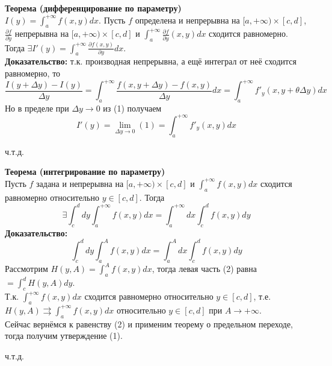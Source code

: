 \documentclass[book, 11pt]{report}
\begin{document}
\par{\textbf{Теорема (дифференцирование по параметру)}\\ 
$\displaystyle I(y)=\int_a^{+\infty}f(x,y)dx$. Пусть $f$ определена и непрерывна на $[a,+\infty)\times[c,d]$, $\displaystyle\frac{\partial f}{\partial y}$ непрерывна на $[a,+\infty)\times[c,d]$ и $\displaystyle\int_a^{+\infty}\frac{\partial f}{\partial y}(x,y)dx$ сходится равномерно. Тогда $\displaystyle\exists I'(y)=\int_a^{+\infty}\frac{\partial f(x,y)}{\partial y}dx$.\\
\textbf{Доказательство: } т.к. производная непрерывна, а ещё интеграл от неё сходится равномерно, то
\begin{equation}
    \frac{I(y+\Delta y)-I(y)}{\Delta y}=\int_a^{+\infty}\frac{f(x,y+\Delta y)-f(x,y)}{\Delta y}dx=\int_a^{+\infty}f'_y(x,y+\theta\Delta y)dx
\end{equation}
Но в пределе при $\Delta y\to0$ из (1) получаем
\begin{equation}
    I'(y)=\lim_{\Delta y\to0}(1)=\int_a^{+\infty}f'_y(x,y)dx
\end{equation}
}
\par{{\raggedleft ч.т.д.\par}}
    \vspace{1.5cm}
    \setcounter{equation}{0}
\par{\textbf{Теорема (интегрирование по параметру)}\\
Пусть $f$ задана и непрерывна на $[a,+\infty)\times[c,d]$ и $\displaystyle\int_a^{+\infty}f(x,y)dx$ сходится равномерно относительно $y\in[c,d]$. Тогда
\begin{equation}
    \exists\int_c^ddy\int_a^{+\infty}f(x,y)dx=\int_a^{+\infty}dx\int_c^df(x,y)dy
\end{equation}
\textbf{Доказательство: }
\begin{equation}
    \int_c^ddy\int_a^{A}f(x,y)dx=\int_a^{A}dx\int_c^df(x,y)dy
\end{equation}
Рассмотрим $\displaystyle H(y,A)=\int_a^Af(x,y)dx$, тогда левая часть (2) равна $\displaystyle=\int_c^dH(y,A)dy$.\\
Т.к. $\displaystyle\int_a^{+\infty}f(x,y)dx$ сходится равномерно относительно $y\in[c,d]$, т.е. $\displaystyle H(y,A)\rightrightarrows\int_a^{+\infty}f(x,y)dx$ относительно $y\in[c,d]$ при $A\to+\infty$. \\Сейчас вернёмся к равенству (2) и применим теорему о предельном переходе, тогда получим утверждение (1). 
}
\par{{\raggedleft ч.т.д.\par}}
    \vspace{3cm}
\setcounter{equation}{0}
\end{document}
